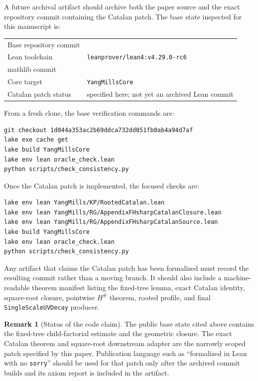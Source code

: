 \documentclass[11pt,a4paper]{article}
\theoremstyle{definition}
\newtheorem{remark}[theorem]{Remark}
\newcommand{\Hsharp}{H^{\#}}
\newcommand{\BaseCommit}{\texttt{\seqsplit{1d044a353ac2b69ddca732dd851fb0ab4a94d7af}}}
\newcommand{\LeanToolchain}{\texttt{leanprover/lean4:v4.29.0-rc6}}
\newcommand{\MathlibCommit}{\texttt{\seqsplit{07642720480157414db592fa85b626dafb71355b}}}
\begin{document}
A future archival artifact should archive both the paper source and the exact repository
commit containing the Catalan patch.  The base state inspected for this manuscript is:
\begin{center}
\begin{tabular}{@{}>{\raggedright\arraybackslash}p{}>{\raggedright\arraybackslash}p{}@{}}
\toprule
Base repository commit & \BaseCommit \\
Lean toolchain & \LeanToolchain \\
mathlib commit & \MathlibCommit \\
Core target & \texttt{YangMillsCore} \\
Catalan patch status & specified here; not yet an archived Lean commit \\
\bottomrule
\end{tabular}
\end{center}

From a fresh clone, the base verification commands are:
\begin{lstlisting}[language={}]
git checkout 1d044a353ac2b69ddca732dd851fb0ab4a94d7af
lake exe cache get
lake build YangMillsCore
lake env lean oracle_check.lean
python scripts/check_consistency.py
\end{lstlisting}
Once the Catalan patch is implemented, the focused checks are:
\begin{lstlisting}[language={}]
lake env lean YangMills/KP/RootedCatalan.lean
lake env lean YangMills/RG/AppendixFHsharpCatalanClosure.lean
lake env lean YangMills/RG/AppendixFHsharpCatalanSource.lean
lake build YangMillsCore
lake env lean oracle_check.lean
python scripts/check_consistency.py
\end{lstlisting}
Any artifact that claims the Catalan patch has been formalized must record the resulting
commit rather than a moving branch.  It should also include a machine-readable theorem
manifest listing the fixed-tree lemma, exact Catalan identity, square-root closure,
pointwise $\Hsharp$ theorem, rooted profile, and final \texttt{SingleScaleUVDecay}
producer.

\begin{remark}[Status of the code claim]
The public base state cited above contains the fixed-tree child-factorial estimate and
the geometric closure.  The exact Catalan theorem and square-root downstream adapter are
the narrowly scoped patch specified by this paper.  Publication language such as
``formalized in Lean with no \texttt{sorry}'' should be used for that patch only after
the archived commit builds and its axiom report is included in the artifact.
\end{remark}
\end{document}
